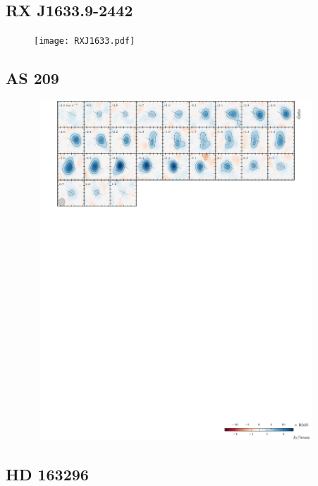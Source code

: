 \documentclass[twocolumn]{aastex6}
\begin{document}
\subsection{RX J1633.9-2442}

\begin{figure}[htb]
\begin{center}
  \texttt{[image: RXJ1633.pdf]}
  \end{center}
\end{figure}

\subsection{AS 209}



\begin{figure}[htb]
\begin{center}
  \includegraphics[draft, width=0.95\textwidth, height=5in]{AS209.pdf}
  \end{center}
\end{figure}

\subsection{HD 163296}
\end{document}
